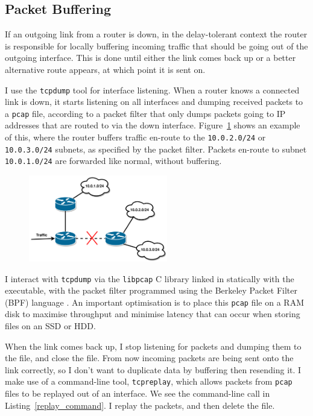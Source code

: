 \documentclass[withindex,glossary,openany]{cam-thesis}
\begin{document}
\subsection{Packet Buffering}
\label{subsec:packet_buffering}

If an outgoing link from a router is down, in the delay-tolerant context the router is responsible for locally buffering incoming traffic that should be going out of the outgoing interface. This is done until either the link comes back up or a better alternative route appears, at which point it is sent on.

I use the \texttt{tcpdump} tool for interface listening. When a router knows a connected link is down, it starts listening on all interfaces and dumping received packets to a \texttt{pcap} file, according to a packet filter that only dumps packets going to IP addresses that are routed to via the down interface. Figure~\ref{fig:ip_route} shows an example of this, where the router buffers traffic en-route to the \texttt{10.0.2.0/24} or \texttt{10.0.3.0/24} subnets, as specified by the packet filter. Packets en-route to subnet \texttt{10.0.1.0/24} are forwarded like normal, without buffering.

\begin{figure}[H]
\centering
	\includegraphics[width=0.54\textwidth]{ip_route}
	\label{fig:ip_route}
\end{figure}

I interact with \texttt{tcpdump} via the \texttt{libpcap} C library linked in statically with the executable, with the packet filter programmed using the Berkeley Packet Filter (BPF) language \cite{STEVEN1993}. An important optimisation is to place this \texttt{pcap} file on a RAM disk to maximise throughput and minimise latency that can occur when storing files on an SSD or HDD.

When the link comes back up, I stop listening for packets and dumping them to the file, and close the file. From now incoming packets are being sent onto the link correctly, so I don't want to duplicate data by buffering then resending it. I make use of a command-line tool, \texttt{tcpreplay}, which allows packets from \texttt{pcap} files to be replayed out of  an interface. We see the command-line call in Listing~\ref{replay_command}. I replay the packets, and then delete the file.
\end{document}
